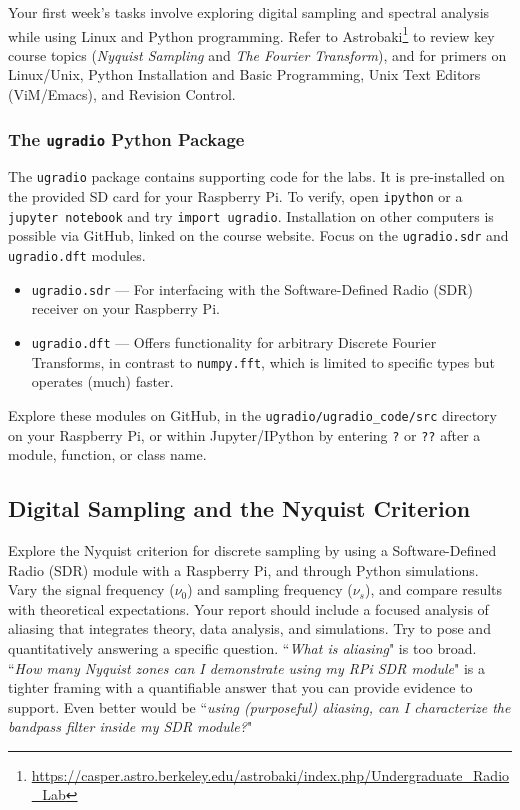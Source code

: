 \documentclass[11pt,preprint]{aastex}
\begin{document}
\noindent
Your first week's tasks involve exploring digital sampling and spectral
analysis while using Linux and Python programming. Refer to
Astrobaki\footnote{\url{https://casper.astro.berkeley.edu/astrobaki/index.php/Undergraduate_Radio_Lab}}
to review key course topics ({\it Nyquist Sampling} and {\it The Fourier
Transform}), and for primers on Linux/Unix, Python Installation and Basic
Programming, Unix Text Editors (ViM/Emacs), and Revision Control.

\subsubsection{The {\tt ugradio} Python Package}

\noindent
The {\tt ugradio} package contains supporting code for the labs. It is pre-installed on the provided SD card for your Raspberry Pi. To verify, open {\tt ipython} or a {\tt jupyter notebook} and try {\tt import ugradio}. Installation on other computers is possible via GitHub, linked on the course website.
Focus on the {\tt ugradio.sdr} and {\tt ugradio.dft} modules.

\begin{itemize}
    \item {\tt ugradio.sdr} --- For interfacing with the Software-Defined Radio (SDR) receiver on your Raspberry Pi.
    \item {\tt ugradio.dft} --- Offers functionality for arbitrary Discrete Fourier Transforms, in contrast to {\tt numpy.fft}, which is limited to specific types but operates (much) faster.
\end{itemize}

\noindent
Explore these modules on GitHub, in the {\tt ugradio/ugradio\_code/src} directory on your Raspberry Pi, or within Jupyter/IPython by entering {\tt ?} or {\tt ??} after a module, function, or class name.




\subsection{Digital Sampling and the Nyquist Criterion}

\noindent
Explore the Nyquist criterion for discrete sampling by using a Software-Defined Radio (SDR) module with a Raspberry Pi, and through Python simulations. Vary the signal frequency ($\nu_0$) and sampling frequency ($\nu_s$), and compare results with theoretical expectations. Your report should include a focused analysis of aliasing that integrates theory, data analysis, and simulations.
Try to pose and quantitatively answering a specific question.
``{\it What is aliasing}" is too broad. ``{\it How many Nyquist zones
can I demonstrate using my RPi SDR module}" is a tighter framing with
a quantifiable answer that you can provide evidence to support. Even better
would be ``{\it using (purposeful) aliasing, can I characterize
the bandpass filter inside my SDR module?}"
\end{document}
